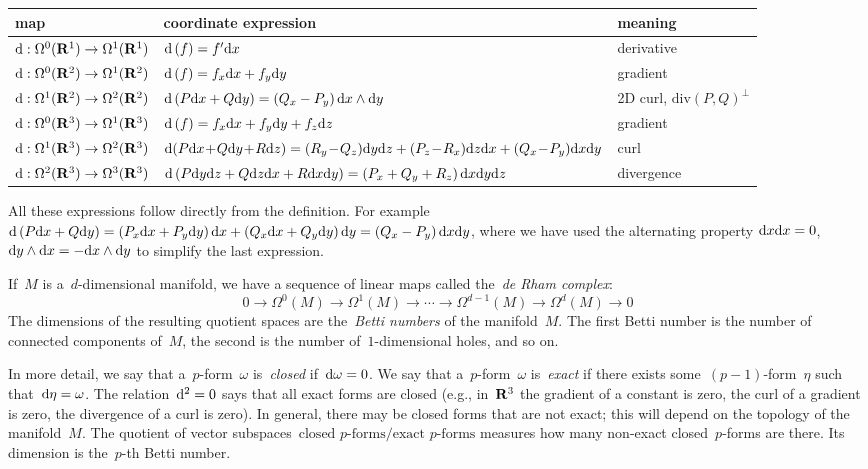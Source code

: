 \begin{tabular}{l|l|l}
	map & coordinate expression & meaning \\
	\hline
	$\mathrm{d}:\Omega^0(\mathbf{R}^1)\to\Omega^1(\mathbf{R}^1)$ &
	$\mathrm{d}\left(f\right) = f'\mathrm{d} x$ &
	derivative\\
	\hline
	$\mathrm{d}:\Omega^0(\mathbf{R}^2)\to\Omega^1(\mathbf{R}^2)$ &
	$\mathrm{d}\left(f\right) = f_x\mathrm{d} x + f_y\mathrm{d} y$ &
	gradient \\
	$\mathrm{d}:\Omega^1(\mathbf{R}^2)\to\Omega^2(\mathbf{R}^2)$ &
	$\mathrm{d}\left(P\mathrm{d} x+Q\mathrm{d} y\right) = \left(Q_x-P_y\right)\mathrm{d} x\wedge\mathrm{d} y$ &
	2D curl, $\mathrm{div}(P,Q)^\perp$ \\
	\hline
	$\mathrm{d}:\Omega^0(\mathbf{R}^3)\to\Omega^1(\mathbf{R}^3)$ &
	$\mathrm{d}\left(f\right) = f_x\mathrm{d} x + f_y\mathrm{d} y + f_z\mathrm{d} z$ &
	gradient \\
	$\mathrm{d}:\Omega^1(\mathbf{R}^3)\to\Omega^2(\mathbf{R}^3)$ &
	\footnotesize
	$\ud\!\left(P\ud x\!+\!Q\ud y\!+\!R\ud z\right) =
	\left(R_y\!-\!Q_z\right)\!\ud y\ud z
	+
	\left(P_z\!-\!R_x\right)\!\ud z\ud x
	+
	\left(Q_x\!-\!P_y\right)\!\ud x\ud y$
	&
	curl \\
	$\mathrm{d}:\Omega^2(\mathbf{R}^3)\to\Omega^3(\mathbf{R}^3)$ &
	$\mathrm{d}\left(P\mathrm{d} y\mathrm{d} z+Q\mathrm{d} z\mathrm{d} x+R\mathrm{d} x\mathrm{d} y\right)
	=\left(P_x+Q_y+R_z\right)\mathrm{d} x\mathrm{d} y\mathrm{d} z$
	&
	divergence
\end{tabular}

All these expressions follow directly from the definition.  For
example~$\mathrm{d}\left(P\mathrm{d} x+Q\mathrm{d} y\right)=
\left(P_x\mathrm{d} x+P_y\mathrm{d} y\right)\mathrm{d} x+\left(Q_x\mathrm{d} x+Q_y\mathrm{d} y\right)\mathrm{d} y
=\left(Q_x-P_y\right)\mathrm{d} x\mathrm{d} y$, where we have used the alternating
property
$\mathrm{d} x\mathrm{d} x=0$,~$\mathrm{d} y\wedge\mathrm{d} x=-\mathrm{d} x\wedge\mathrm{d} y$ to simplify the last
expression.

If~$M$ is a~$d$-dimensional manifold, we have a sequence of linear maps
called the~\emph{de Rham complex}:
\[
	0
	\to
	\Omega^0(M)
	\to
	\Omega^1(M)
	\to\cdots\to
	\Omega^{d-1}(M)
	\to
	\Omega^d(M)
	\to
	0
\]
The dimensions of the resulting quotient spaces are the~\emph{Betti numbers}
of the manifold~$M$.  The first Betti number is the number of connected
components of~$M$, the second is the number of~$1$-dimensional holes, and so
on.

In more detail, we say that a~$p$-form~$\omega$ is~\emph{closed}
if~$\mathrm{d}\omega=0$.  We say that a~$p$-form~$\omega$ is~\emph{exact} if there
exists some~$(p-1)$-form~$\eta$ such that~$\mathrm{d}\eta=\omega$.  The
relation~$\mathrm{d}^2=0$ says that all exact forms are closed (e.g., in~$\mathbf{R}^3$ the
gradient of a constant is zero, the curl of a gradient is zero, the
divergence of a curl is zero).  In general, there may be closed forms that
are not exact; this will depend on the topology of the manifold~$M$.  The quotient of vector
subspaces~$\textrm{closed $p$-forms}/\textrm{exact $p$-forms}$ measures how
many non-exact closed~$p$-forms are there.  Its dimension is the~$p$-th Betti
number.

